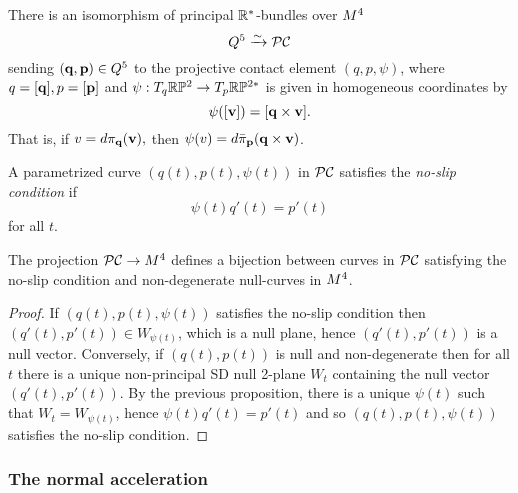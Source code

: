 \begin{proposition}
There is an isomorphism of principal $\mathbb{R}^*$-bundles over $M^4$
$$Q^5\xrightarrow{\sim}\mathcal{PC}$$
sending $(\mathbf q,{\mathbf p})\in Q^5$  to the projective contact element $(q,p,\psi)$, where $q=[\mathbf q], p=[{\mathbf p}]$ and $\psi:T_q\mathbb{R}\mathbb{P}^2\to T_p\mathbb{R}\mathbb{P}^{2*}$ is given in homogeneous coordinates by $$\psi([{\mathbf v}])=[\mathbf q\times{\mathbf v}].$$ 
That is, if $v=d\pi_\mathbf q({\mathbf v}),$ then $\psi(v)=d\bar \pi_{\mathbf p}(\mathbf q\times{\mathbf v})$. 
\end{proposition}


\begin{definition}
A parametrized curve $(q(t), p(t), \psi(t))$ in $\mathcal{PC}$ satisfies the {\em no-slip condition} if  $$\psi(t)q'(t)=p'(t)$$ for all $t$.
\end{definition}

\begin{proposition}The projection $\mathcal{PC}\to M^4$ defines a bijection between curves in $\mathcal{PC}$ satisfying the no-slip condition and non-degenerate null-curves in $M^4$. 
\end{proposition}

\begin{proof} If $(q(t), p(t), \psi(t))$ satisfies the no-slip condition then $(q'(t),p'(t))\in W_{\psi(t)}$, which is a null plane, hence $(q'(t),p'(t))$ is a null vector. Conversely, if $(q(t), p(t))$ is  null and non-degenerate then for all $t$ there is a unique non-principal  SD null 2-plane $W_t$ containing the null vector $(q'(t), p'(t))$. By the previous proposition, there is a unique $\psi(t)$ such that $W_t=W_{\psi(t)}$, hence $\psi(t)q'(t)=p'(t)$ and so 
$(q(t), p(t), \psi(t))$ satisfies the no-slip condition. \end{proof}








\subsubsection{The normal acceleration}


